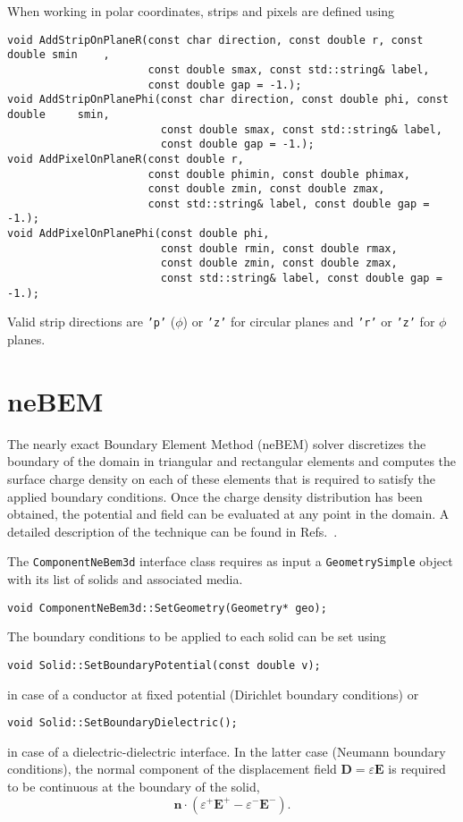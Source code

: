 When working in polar coordinates, strips and pixels are defined using
\begin{lstlisting}
void AddStripOnPlaneR(const char direction, const double r, const double smin    ,
                      const double smax, const std::string& label,
                      const double gap = -1.);
void AddStripOnPlanePhi(const char direction, const double phi, const double     smin,
                        const double smax, const std::string& label,
                        const double gap = -1.);
void AddPixelOnPlaneR(const double r,
                      const double phimin, const double phimax,
                      const double zmin, const double zmax,
                      const std::string& label, const double gap = -1.);
void AddPixelOnPlanePhi(const double phi,
                        const double rmin, const double rmax,
                        const double zmin, const double zmax,
                        const std::string& label, const double gap = -1.);
\end{lstlisting} 
Valid strip directions are \texttt{'p'} ($\phi$) or \texttt{'z'} for 
circular planes and \texttt{'r'} or \texttt{'z'} for $\phi$ planes.

\section{neBEM}
The nearly exact Boundary Element Method (neBEM) solver discretizes
the boundary of the domain in triangular and rectangular elements 
and computes the surface charge density on each of these elements that is
required to satisfy the applied boundary conditions. 
Once the charge density distribution has been obtained, 
the potential and field can be evaluated at any point in the domain. 
A detailed description of the technique can be found in 
Refs.~\cite{Mukhopadhyay2006Eng,Mukhopadhyay2006,Mukhopadhyay2009}. 
 
The \texttt{ComponentNeBem3d} interface class requires as input a 
\texttt{GeometrySimple} object with its list of solids and associated 
media. 
\begin{lstlisting}
void ComponentNeBem3d::SetGeometry(Geometry* geo);
\end{lstlisting}
The boundary conditions to be applied to each solid can be set using
\begin{lstlisting}
void Solid::SetBoundaryPotential(const double v);
\end{lstlisting}
in case of a conductor at fixed potential (Dirichlet boundary conditions) 
or 
\begin{lstlisting}
void Solid::SetBoundaryDielectric();
\end{lstlisting}
in case of a dielectric-dielectric interface. 
In the latter case (Neumann boundary conditions), 
the normal component of the displacement field $\mathbf{D} = \varepsilon\mathbf{E}$ is required to be continuous at the boundary of the solid,
\begin{equation*}
  \mathbf{n}\cdot\left(\varepsilon^{+}\mathbf{E}^{+} - \varepsilon^{-}\mathbf{E}^{-}\right).
\end{equation*}

